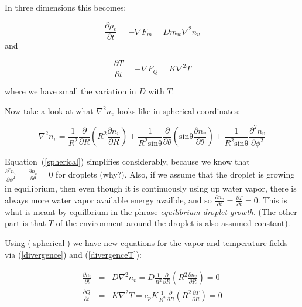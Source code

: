 \documentclass[12pt]{article}
\begin{document}
\noindent
In three dimensions this becomes:

\begin{equation}
  \label{divergence}
  \frac{\partial \rho_v}{\partial t} = - \nabla F_m = D m_w \nabla^2 n_v
\end{equation}
and

\begin{equation}
  \label{divergenceT}
  \frac{\partial T}{\partial t} = - \nabla F_Q = K \nabla^2 T
\end{equation}


\noindent
where we have small the variation in $D$ with $T$.

Now take a look at what $\nabla^2 n_v$ looks like in spherical
coordinates:

\begin{equation}
  \label{spherical}
  \nabla^2 n_v = \frac{1}{R^2} \frac{\partial}{\partial R} \left ( 
               R^2 \frac{\partial n_v}{\partial R} \right )
             + \frac{1}{R^2 \mathrm{sin \theta}}
             \frac{\partial}{\partial \theta} 
              \left (\mathrm{sin \theta} \frac{\partial n_v}{\partial \theta} \right )
             + \frac{1}{R^2 \mathrm{sin \theta}}
             \frac{\partial^2 n_v}{\partial \phi^2} 
\end{equation}

Equation~(\ref{spherical}) simplifies considerably, because we know
that $\frac{\partial^2 n_v}{\partial \phi^2}=\frac{\partial
  n_v}{\partial \theta}=0$ for droplets (why?).  Also, if we assume
that the droplet is growing in equilibrium, then even though it is
continuously using up water vapor, there is always more water vapor
available energy availble, and so 
$\frac{\partial n_v}{\partial t} = \frac{\partial T}{\partial t} =0$. This is 
what is meant by equilbrium in the phrase \textit{equilibrium droplet growth}.
(The other part is that $T$ of the environment around the droplet is
also assumed constant).

Using (\ref{spherical}) we have new equations for the vapor and
temperature fields via (\ref{divergence}) and (\ref{divergenceT}):

\begin{eqnarray}
  \label{duel}
  \frac{\partial n_v}{\partial t}& = & D \nabla^2 n_v = D \frac{1}{R^2}
               \frac{\partial}{\partial R} \left ( R^2 \frac{\partial
               n_v}{\partial R} \right ) = 0 \nonumber \\
  \frac{\partial Q}{\partial t}& = &  K \nabla^2 T = c_p K \frac{1}{R^2}
               \frac{\partial}{\partial R} \left ( R^2 \frac{\partial
               T}{\partial R} \right ) = 0
\end{eqnarray}
\end{document}
